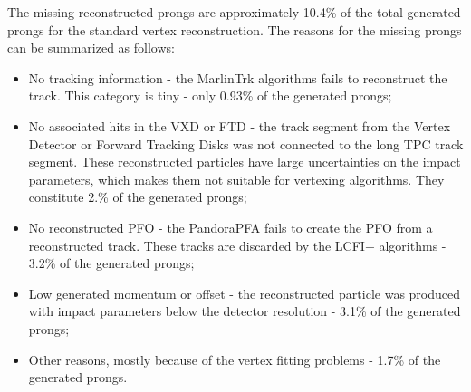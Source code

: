 The missing reconstructed prongs are approximately 10.4\% of the total generated prongs for the standard vertex reconstruction. 
The reasons for the missing prongs can be summarized as follows:
\begin{itemize}
\item No tracking information - the MarlinTrk algorithms fails to reconstruct the track. This category is tiny - only 0.93\% of the generated prongs;
\item No associated hits in the VXD or FTD - the track segment from the Vertex Detector or Forward Tracking Disks was not connected to the long TPC track segment. These reconstructed particles have large uncertainties on the impact parameters, which makes them not suitable for vertexing algorithms. They constitute 2.\% of the generated prongs;
\item No reconstructed PFO - the PandoraPFA fails to create the PFO from a reconstructed track. These tracks are discarded by the LCFI+ algorithms - 3.2\%  of the generated prongs;
\item Low generated momentum or offset  - the reconstructed particle was produced with impact parameters below the detector resolution - 3.1\%  of the generated prongs;
\item Other reasons, mostly because of the vertex fitting problems - 1.7\% of the generated prongs.
\end{itemize}



